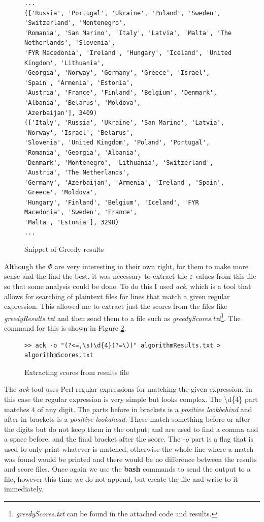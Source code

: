\documentclass[12pt]{report}
\begin{document}
\begin{figure}[H]
\caption{Snippet of Greedy results}
\label{greedyResFile}
\begin{verbatim}
...
(['Russia', 'Portugal', 'Ukraine', 'Poland', 'Sweden', 'Switzerland', 'Montenegro',
'Romania', 'San Marino', 'Italy', 'Latvia', 'Malta', 'The Netherlands', 'Slovenia', 
'FYR Macedonia', 'Ireland', 'Hungary', 'Iceland', 'United Kingdom', 'Lithuania', 
'Georgia', 'Norway', 'Germany', 'Greece', 'Israel', 'Spain', 'Armenia', 'Estonia', 
'Austria', 'France', 'Finland', 'Belgium', 'Denmark', 'Albania', 'Belarus', 'Moldova', 
'Azerbaijan'], 3409)
(['Italy', 'Russia', 'Ukraine', 'San Marino', 'Latvia', 'Norway', 'Israel', 'Belarus', 
'Slovenia', 'United Kingdom', 'Poland', 'Portugal', 'Romania', 'Georgia', 'Albania', 
'Denmark', 'Montenegro', 'Lithuania', 'Switzerland', 'Austria', 'The Netherlands', 
'Germany', 'Azerbaijan', 'Armenia', 'Ireland', 'Spain', 'Greece', 'Moldova', 
'Hungary', 'Finland', 'Belgium', 'Iceland', 'FYR Macedonia', 'Sweden', 'France', 
'Malta', 'Estonia'], 3298)
...
\end{verbatim}
\end{figure}

Although the $\Phi$ are very interesting in their own right, for them to make more sense and the find the best, it was necessary to extract the $\varepsilon$ values from this file so that some analysis could be done. To do this I used \textit{ack}\cite{ack}, which is a tool that allows for searching of plaintext files for lines that match a given regular expression. This allowed me to extract just the scores from the files like \textit{greedyResults.txt} and then send them to a file such as \textit{greedyScores.txt}\footnote{\textit{greedyScores.txt} can be found in the attached code and results.}. The command for this is shown in Figure \ref{ackCommand}.

\begin{figure}[H]
\caption{Extracting scores from results file}
\label{ackCommand}
\begin{verbatim}
>> ack -o "(?<=,\s)\d{4}(?=\))" algorithmResults.txt > algorithmScores.txt
\end{verbatim}
\end{figure}

The \textit{ack} tool uses Perl regular expressions for matching the given expression. In this case the regular expression is very simple but looks complex. The \textbackslash d\{4\} part matches 4 of any digit. The parts before in brackets is a \textit{positive lookbehind} and after in brackets is a \textit{positive lookahead}. These match something before or after the digits but do not keep them in the output; and are used to find a comma and a space before, and the final bracket after the score. The \textit{-o} part is a flag that is used to only print whatever is matched, otherwise the whole line where a match was found would be printed and there would be no difference between the results and score files. Once again we use the \textbf{bash} commands to send the output to a file, however this time we do not append, but create the file and write to it immediately.
\end{document}
